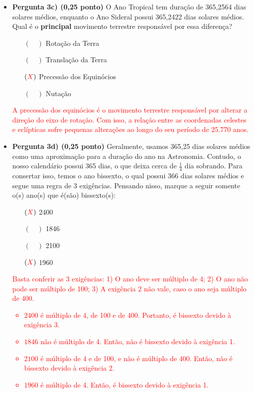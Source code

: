 \documentclass[a4paper, 12pt]{article}
\begin{document}
\begin{flushleft}
\begin{itemize}
\begin{itemize}
				\item \textbf{Pergunta 3c) (0,25 ponto)} O Ano Tropical tem duração de 365,2564 dias solares médios, enquanto o Ano Sideral possui 365,2422 dias solares médios. Qual é o \textbf{principal} movimento terrestre responsável por essa diferença?
					\begin{itemize}
						\item[$(\quad)$] Rotação da Terra
						\item[$(\quad)$] Translação da Terra
						\item[$(\textcolor{red}{X})$] Precessão dos Equinócios
						\item[$(\quad)$] Nutação
					\end{itemize}
					\textcolor{red}{A precessão dos equinócios é o movimento terrestre responsável por alterar a direção do eixo de rotação. Com isso, a relação entre as coordenadas celestes e eclípticas sofre pequenas alterações ao longo do seu período de 25.770 anos.}
				\item \textbf{Pergunta 3d) (0,25 ponto)} Geralmente, usamos 365,25 dias solares médios como uma aproximação para a duração do ano na Astronomia. Contudo, o nosso calendário possui 365 dias, o que deixa cerca de $\frac{1}{4}$ dia sobrando. Para consertar isso, temos o ano bissexto, o qual possui 366 dias solares médios e segue uma regra de 3 exigências. Pensando nisso, marque a seguir somente o(s) ano(s) que é(são) bissexto(s):
					\begin{itemize}
						\item[$(\textcolor{red}{X})$] 2400
						\item[$(\quad)$] 1846
						\item[$(\quad)$] 2100
						\item[$(\textcolor{red}{X})$] 1960
					\end{itemize}
					\textcolor{red}{Basta conferir as 3 exigências: 1) O ano deve ser múltiplo de 4; 2) O ano não pode ser múltiplo de 100; 3) A exigência 2 não vale, caso o ano seja múltiplo de 400.}
					\textcolor{red}
					{
						\begin{itemize}
							\item $2400$ é múltiplo de 4, de 100 e de 400. Portanto, é bissexto devido à exigência 3.
							\item $1846$ não é múltiplo de 4. Então, não é bissexto devido à exigência 1.
							\item $2100$ é múltiplo de 4 e de 100, e não é múltiplo de 400. Então, não é bissexto devido à exigência 2.
							\item $1960$ é múltiplo de 4. Então, é bissexto devido à exigência 1.
						\end{itemize}
					}
			\end{itemize}
		

\end{itemize}
\end{flushleft}
\end{document}
